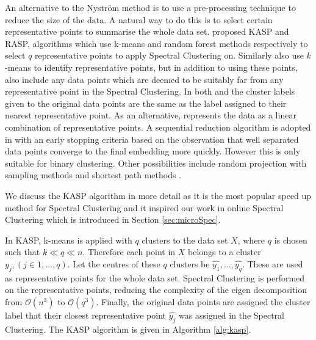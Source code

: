 An alternative to the Nystr\"{o}m method is to use a pre-processing technique to reduce the size of the data. A natural way to do this is to select certain representative points to summarise the whole data set.  \cite{Yan2009} proposed KASP and RASP, algorithms which use k-means and random forest methods respectively to select $q$ representative points to apply Spectral Clustering on.  Similarly \cite{Shinnou2008} also use $k$-means to identify representative points, but in addition to using these points, \cite{Shinnou2008} also include any data points which are deemed to be suitably far from any representative point in the Spectral Clustering.  In both \cite{Yan2009} and \cite{Shinnou2008} the cluster labels given to the original data points are the same as the label assigned to their nearest representative point. As an alternative, \cite{Chen2011} represents the data as a linear combination of representative points. A sequential reduction algorithm is adopted in  \cite{Chen2006a,Liu2007} with an early stopping criteria based on the observation that well separated data points converge to the final embedding more quickly. However this is only suitable for binary clustering.  Other possibilities include random projection with sampling methods \citep{Sakai2009} and shortest path methods \citep{Liu2013b}.


We discuss the KASP algorithm in more detail as it is the most popular speed up method for Spectral Clustering and it inspired our work in online Spectral Clustering which is introduced in Section \ref{sec:microSpec}.

In KASP, k-means is applied with $q$ clusters to the data set $X$, where $q$ is chosen such that $k \ll q \ll n$. Therefore each point in $X$ belongs to a cluster $y_j, (j \in 1, \hdots, q)$. Let the centres of these $q$ clusters be  $\widehat{y_1}, \hdots, \widehat{y_q}$. These  are used as representative points for the whole data set. Spectral Clustering is performed on the representative points, reducing the complexity of the eigen decomposition from $\mathcal{O}(n^3)$ to $\mathcal{O}(q^3)$. Finally, the original data points are assigned the cluster label  that their closest representative point $\widehat{y_j}$ was assigned in the Spectral Clustering. The KASP algorithm is given in Algorithm \ref{alg:kasp}.

